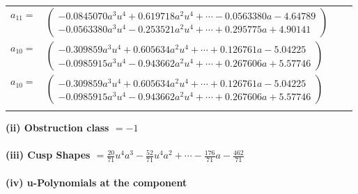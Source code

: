 \documentclass[1p]{elsarticle_modified}
\theoremstyle{definition}
\begin{document}
\begin{tabular}{m{7pt} m{180pt} m{7pt} m{180pt} }
\flushright $a_{11}=$&$\begin{pmatrix}-0.0845070 a^{3} u^{4}+0.619718 a^{2} u^{4}+\cdots-0.0563380 a-4.64789\\-0.0563380 a^{3} u^{4}-0.253521 a^{2} u^{4}+\cdots+0.295775 a+4.90141\end{pmatrix}$ \\
\flushright $a_{10}=$&$\begin{pmatrix}-0.309859 a^{3} u^{4}+0.605634 a^{2} u^{4}+\cdots+0.126761 a-5.04225\\-0.0985915 a^{3} u^{4}-0.943662 a^{2} u^{4}+\cdots+0.267606 a+5.57746\end{pmatrix}$\\ \flushright $a_{10}=$&$\begin{pmatrix}-0.309859 a^{3} u^{4}+0.605634 a^{2} u^{4}+\cdots+0.126761 a-5.04225\\-0.0985915 a^{3} u^{4}-0.943662 a^{2} u^{4}+\cdots+0.267606 a+5.57746\end{pmatrix}$\\&\end{tabular}
\flushleft \textbf{(ii) Obstruction class $= -1$}\\~\\
\flushleft \textbf{(iii) Cusp Shapes $= \frac{20}{71} u^4 a^3-\frac{52}{71} u^4 a^2+\cdots-\frac{176}{71} a-\frac{462}{71}$}\\~\\
\newpage\renewcommand{\arraystretch}{1}
\flushleft \textbf{(iv) u-Polynomials at the component}\newline \\
\end{document}
